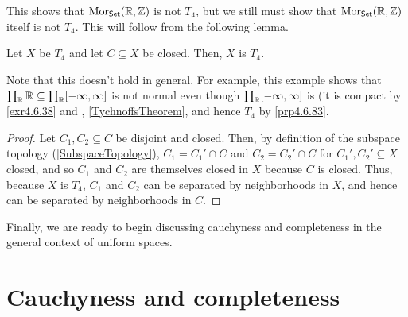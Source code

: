 \begin{exm}
\begin{savenotes}
This shows that $\operatorname{Mor} _{\mathsf{Set}}(\mathbb{R} ,\mathbb{Z} )$ is not $T_4$, but we still must show that $\operatorname{Mor} _{\mathsf{Set}}(\mathbb{R} ,\mathbb{Z} )$ itself is not $T_4$.  This will follow from the following lemma.
\begin{lma}
Let $X$ be $T_4$ and let $C\subseteq X$ be closed.  Then, $X$ is $T_4$.
\begin{rmk}
Note that this doesn't hold in general.  For example, this example shows that $\prod _{\mathbb{R}} \mathbb{R} \subseteq \prod _{\mathbb{R}} [-\infty ,\infty ]$ is not normal even though $\prod _{\mathbb{R}} [-\infty ,\infty ]$ is (it is compact by \cref{exr4.6.38} and , \cref{TychnoffsTheorem}, and hence $T_4$ by \cref{prp4.6.83}.
\end{rmk}
\begin{proof}
Let $C_1,C_2\subseteq C$ be disjoint and closed.  Then, by definition of the subspace topology (\cref{SubspaceTopology}), $C_1=C_1'\cap C$ and $C_2=C_2'\cap C$ for $C_1',C_2'\subseteq X$ closed, and so $C_1$ and $C_2$ are themselves closed in $X$ because $C$ is closed.  Thus, because $X$ is $T_4$, $C_1$ and $C_2$ can be separated by neighborhoods in $X$, and hence can be separated by neighborhoods in $C$.
\end{proof}
\end{lma}
\end{savenotes}
\end{exm}

Finally, we are ready to begin discussing cauchyness and completeness in the general context of uniform spaces.

\section{Cauchyness and completeness}


